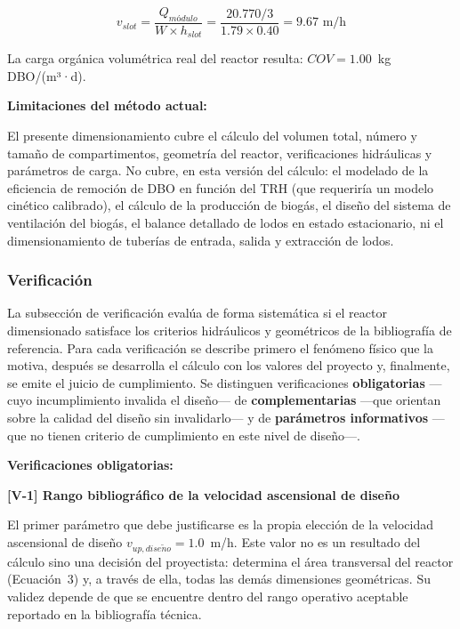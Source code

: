 \documentclass[12pt,a4paper]{article}
\begin{document}
\begin{equation}
v_{slot} = \frac{Q_{módulo}}{W \times h_{slot}} = \frac{20.770 / 3}{1.79 \times 0.40} = 9.67 \text{ m/h}
\end{equation}

La carga orgánica volumétrica real del reactor resulta: $COV = 1.00$~kg\,DBO/(m³·d). 

\textbf{Limitaciones del método actual:}

El presente dimensionamiento cubre el cálculo del volumen total, número y tamaño de compartimentos, geometría del reactor, verificaciones hidráulicas y parámetros de carga. No cubre, en esta versión del cálculo: el modelado de la eficiencia de remoción de DBO en función del TRH (que requeriría un modelo cinético calibrado), el cálculo de la producción de biogás, el diseño del sistema de ventilación del biogás, el balance detallado de lodos en estado estacionario, ni el dimensionamiento de tuberías de entrada, salida y extracción de lodos.

\subsubsection{Verificación}

La subsección de verificación evalúa de forma sistemática si el reactor dimensionado satisface los criterios hidráulicos y geométricos de la bibliografía de referencia. Para cada verificación se describe primero el fenómeno físico que la motiva, después se desarrolla el cálculo con los valores del proyecto y, finalmente, se emite el juicio de cumplimiento. Se distinguen verificaciones \textbf{obligatorias} ---cuyo incumplimiento invalida el diseño--- de \textbf{complementarias} ---que orientan sobre la calidad del diseño sin invalidarlo--- y de \textbf{parámetros informativos} ---que no tienen criterio de cumplimiento en este nivel de diseño---.

\textbf{Verificaciones obligatorias:}

\textbf{[V-1] Rango bibliográfico de la velocidad ascensional de diseño}

El primer parámetro que debe justificarse es la propia elección de la velocidad ascensional de diseño $v_{up,dise\tilde{n}o} = 1.0$~m/h. Este valor no es un resultado del cálculo sino una decisión del proyectista: determina el área transversal del reactor (Ecuación~3) y, a través de ella, todas las demás dimensiones geométricas. Su validez depende de que se encuentre dentro del rango operativo aceptable reportado en la bibliografía técnica.
\end{document}
